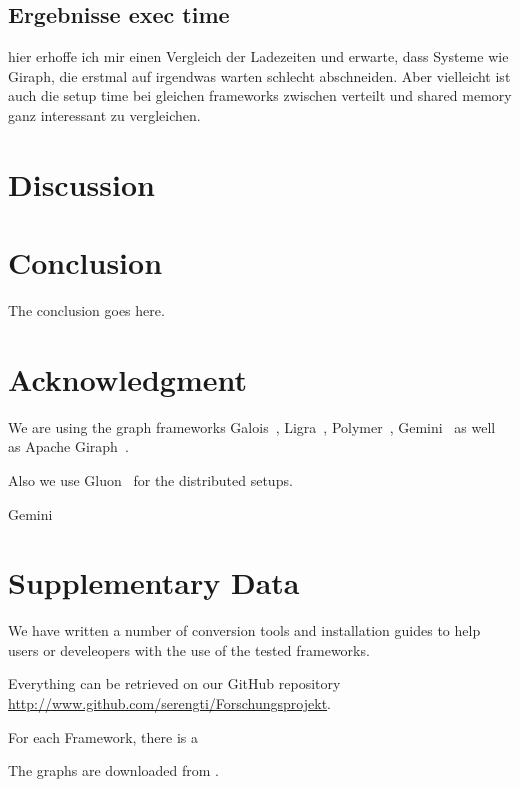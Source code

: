 \documentclass[conference,a4paper]{IEEEtran}
\begin{document}
\subsection{Ergebnisse exec time}
hier erhoffe ich mir einen Vergleich der Ladezeiten und erwarte, dass Systeme wie Giraph, die erstmal auf irgendwas warten schlecht abschneiden.
Aber vielleicht ist auch die setup time bei gleichen frameworks zwischen verteilt und shared memory ganz interessant zu vergleichen. 



\section{Discussion}




\section{Conclusion}
The conclusion goes here.



\section*{Acknowledgment}
We are using the graph frameworks Galois~\cite{Galois}, Ligra~\cite{Ligra}, Polymer~\cite{Polymer}, Gemini~\cite{Gemini} as well as Apache Giraph~\cite{Giraph}.

Also we use Gluon~\cite{vertGalois} for the distributed setups.

Gemini~\cite{Gemini}

\section*{Supplementary Data}\label{supplementaryData}
We have written a number of conversion tools and installation guides to help
users or develeopers with the use of the tested frameworks.

Everything can be retrieved on our GitHub repository
\url{http://www.github.com/serengti/Forschungsprojekt}.

For each Framework, there is a 


The graphs are downloaded from \cite{konect}.



\end{document}
